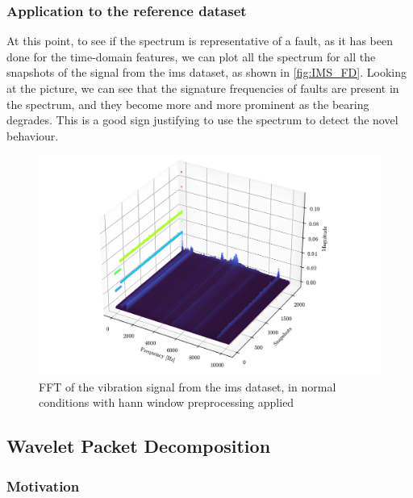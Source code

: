\subsubsection{Application to the reference dataset}

At this point, to see if the spectrum is representative of a fault, as it has been done for the time-domain features, we can plot all the spectrum for all the snapshots of the  signal from the \gls{ims} dataset, as shown in \autoref{fig:IMS_FD}. Looking at the picture, we can see that the signature frequencies of faults are present in the spectrum, and they become more and more prominent as the bearing degrades. This is a good sign justifying to use the spectrum to detect the novel behaviour.

\begin{figure}
    \centering
    \includegraphics[width=\textwidth]{images/FeatureExtraction/FD_IMS.png}
    \caption{FFT of the  vibration signal from the \gls{ims} dataset, in normal conditions with hann window preprocessing
    applied}
    \label{fig:IMS_FD}
\end{figure}


\subsection{Wavelet Packet Decomposition}
\label{sec:WPD}

\subsubsection{Motivation}

